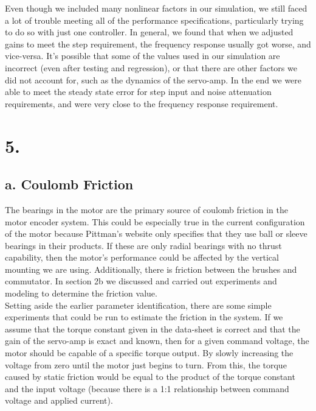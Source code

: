 \documentclass{article}
\theoremstyle{plain}
\theoremstyle{definition}
\theoremstyle{remark}
\begin{document}
Even though we included many nonlinear factors in our simulation, we still faced a lot of trouble meeting all of the performance specifications, particularly trying to do so with just one controller. In general, we found that when we adjusted gains to meet the step requirement, the frequency response usually got worse, and vice-versa. It's possible that some of the values used in our simulation are incorrect (even after testing and regression), or that there are other factors we did not account for, such as the dynamics of the servo-amp. In the end we were able to meet the steady state error for step input and noise attenuation requirements, and were very close to the frequency response requirement.\\


\clearpage 

\section*{5.}

\subsection*{a. Coulomb Friction}
The bearings in the motor are the primary source of coulomb friction in the motor encoder system. This could be especially true in the current configuration of the motor because Pittman's website only specifies that they use ball or sleeve bearings in their products. If these are only radial bearings with no thrust capability, then the motor's performance could be affected by the vertical mounting we are using. Additionally, there is friction between the brushes and commutator. In section 2b we discussed and carried out experiments and modeling to determine the friction value.\\


Setting aside the earlier parameter identification, there are some simple experiments that could be run to estimate the friction in the system. If we assume that the torque constant given in the data-sheet is correct and that the gain of the servo-amp is exact and known, then for a given command voltage, the motor should be capable of a specific torque output. By slowly increasing the voltage from zero until the motor just begins to turn. From this, the torque caused by static friction would be equal to the product of the torque constant and the input voltage (because there is a 1:1 relationship between command voltage and applied current). \\
\end{document}
